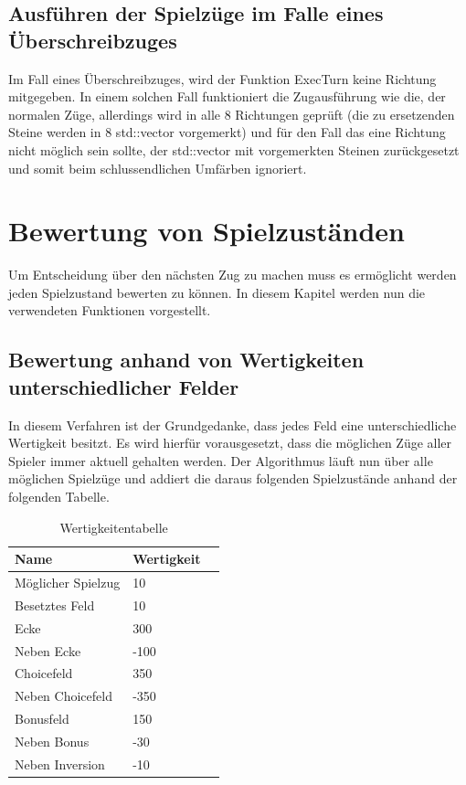 \documentclass[12pt,a4paper,bibliography=totocnumbered,listof=totocnumbered]{scrartcl}
\begin{document}
\subsection{Ausführen der Spielzüge im Falle eines Überschreibzuges}
Im Fall eines Überschreibzuges, wird der Funktion ExecTurn keine Richtung mitgegeben.
In einem solchen Fall funktioniert die Zugausführung wie die, der normalen Züge,
allerdings wird in alle 8 Richtungen geprüft (die zu ersetzenden Steine werden in 8 std::vector vorgemerkt) und für den Fall das eine Richtung nicht möglich sein sollte, der std::vector mit vorgemerkten Steinen zurückgesetzt und somit beim schlussendlichen Umfärben ignoriert.
\pagebreak

\section{Bewertung von Spielzuständen}
Um Entscheidung über den nächsten Zug zu machen muss es ermöglicht werden jeden Spielzustand bewerten zu können.
In diesem Kapitel werden nun die verwendeten Funktionen vorgestellt.

\subsection{Bewertung anhand von Wertigkeiten unterschiedlicher Felder}
In diesem Verfahren ist der Grundgedanke, dass jedes Feld eine unterschiedliche Wertigkeit besitzt.
Es wird hierfür vorausgesetzt, dass die möglichen Züge aller Spieler immer aktuell gehalten werden.
\vspace{1em}
Der Algorithmus läuft nun über alle möglichen Spielzüge und addiert die daraus folgenden Spielzustände anhand der folgenden Tabelle. 
\vspace{1em}

\begin{table}[!h]
	\centering
	\begin{tabular}{|l|l|l|}
		\hline
		\textbf{Name} & \textbf{Wertigkeit}\\
		\hline
		 Möglicher Spielzug & 10\\
		\hline
		Besetztes Feld  &  10\\
		\hline
		Ecke & 300\\
		\hline
		Neben Ecke & -100\\
		\hline
		 Choicefeld & 350\\
		\hline
		Neben Choicefeld & -350\\
		\hline
		 Bonusfeld & 150\\
		\hline
		 Neben Bonus & -30\\
		\hline
		 Neben Inversion & -10\\
		\hline
	\end{tabular}
	\caption{Wertigkeitentabelle}
	\label{tab:Wertigkeit}
\end{table}
\end{document}
